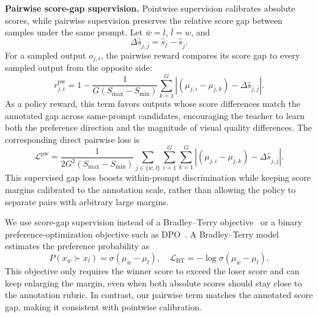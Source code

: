 \documentclass{article}
\begin{document}
\textbf{Pairwise score-gap supervision.}
Pointwise supervision calibrates absolute scores, while pairwise supervision preserves the relative score gap between samples under the same prompt. Let $\bar{w}=l$, $\bar{l}=w$, and
\begin{equation}
\Delta \hat{s}_{j,\bar{j}} = \hat{s}_j - \hat{s}_{\bar{j}}.
\label{eq:score-gap}
\end{equation}
For a sampled output $o_{j,i}$, the pairwise reward compares its score gap to every sampled output from the opposite side:
\begin{equation}
r^{\mathrm{pw}}_{j,i}
=
1 -
\frac{1}{G(S_{\max}-S_{\min})}
\sum_{k=1}^{G}
\left|
(\mu_{j,i}-\mu_{\bar{j},k})-\Delta \hat{s}_{j,\bar{j}}
\right|.
\label{eq:pairwise-reward}
\end{equation}
As a policy reward, this term favors outputs whose score differences match the annotated gap across same-prompt candidates, encouraging the teacher to learn both the preference direction and the magnitude of visual quality differences. The corresponding direct pairwise loss is
\begin{equation}
\mathcal{L}^{\mathrm{pw}}
=
\frac{1}{2G^2(S_{\max}-S_{\min})}
\sum_{j \in \{w,l\}}\sum_{i=1}^{G}\sum_{k=1}^{G}
\left|
(\mu_{j,i}-\mu_{\bar{j},k})-\Delta \hat{s}_{j,\bar{j}}
\right|.
\label{eq:pairwise-loss}
\end{equation}
This supervised gap loss boosts within-prompt discrimination while keeping score margins calibrated to the annotation scale, rather than allowing the policy to separate pairs with arbitrary large margins.

We use score-gap supervision instead of a Bradley--Terry objective~\cite{Bradley1952RANKAO} or a binary preference-optimization objective such as DPO~\cite{rafailov2023direct}. A Bradley--Terry model estimates the preference probability as
\begin{equation}
P(x_w \succ x_l)
=
\sigma(\mu_w-\mu_l),
\quad
\mathcal{L}_{\mathrm{BT}}
=
-\log \sigma(\mu_w-\mu_l).
\label{eq:bt-loss}
\end{equation}
This objective only requires the winner score to exceed the loser score and can keep enlarging the margin, even when both absolute scores should stay close to the annotation rubric. In contrast, our pairwise term matches the annotated score gap, making it consistent with pointwise calibration.
\end{document}
